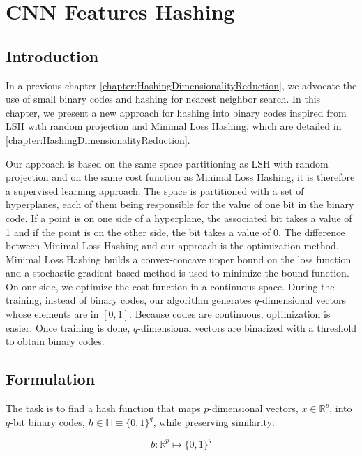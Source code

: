 \chapter{CNN Features Hashing}

\label{chapter:CNNFeaturesHashing}


\section{Introduction}
In a previous chapter \ref{chapter:HashingDimensionalityReduction}, we advocate the use of small binary codes and hashing for nearest neighbor search. In this chapter, we present a new approach for hashing into binary codes inspired from LSH with random projection and Minimal Loss Hashing, which are detailed in \ref{chapter:HashingDimensionalityReduction}.
	
Our approach is based on the same space partitioning as LSH with random projection and on the same cost function as Minimal Loss Hashing, it is therefore a supervised learning approach. The space is partitioned with a set of hyperplanes, each of them being responsible for the value of one bit in the binary code. If a point is on one side of a hyperplane, the associated bit takes a value of 1 and if the point is on the other side, the bit takes a value of 0. The difference between Minimal Loss Hashing and our approach is the optimization method. Minimal Loss Hashing builds a convex-concave upper bound on the loss function and a stochastic gradient-based method is used to minimize the bound function. On our side, we optimize the cost function in a continuous space. During the training, instead of binary codes, our algorithm generates $q$-dimensional vectors whose elements are in $[0, 1]$. Because codes are continuous, optimization is easier. Once training is done, $q$-dimensional vectors are binarized with a threshold to obtain binary codes.

\section{Formulation}
The task is to find a hash function that maps $p$-dimensional vectors, $x\in\mathbb{R}^{p}$, into $q$-bit binary codes, $h\in\mathbb{H}\equiv\{0, 1\}^{q}$, while preserving similarity:

\[b: \mathbb{R}^{p} \mapsto \{0, 1\}^{q}\]

